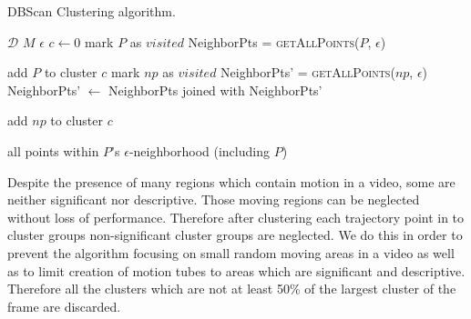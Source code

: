 \begin{algorithm}
 \caption{DBScan Clustering algorithm.}
   \label{alg:Clustering algorithm}
    \begin{algorithmic}[1]
    \Require  $\mathcal{D}$ 
    \Require $M$ 
    \Require $\epsilon$ 
        \State $c \leftarrow 0$ 
	  \EndIf
            \State mark $P$ as $visited$
            \State NeighborPts = \textsc{getAllPoints}($P$, $\epsilon$)
          \Else
          \EndIf
        \EndFor

	\State add $P$ to cluster $c$
	    \State mark $np$ as $visited$
	    \State NeighborPts' = \textsc{getAllPoints}($np$, $\epsilon$)
            \State NeighborPts' $\leftarrow$ NeighborPts joined with NeighborPts'
            \EndIf
	
	  \EndIf
         \State add $np$ to cluster $c$
         \EndIf
	\EndFor
       \EndFunction

       \Return all points within $P$'s $\epsilon$-neighborhood (including $P$)
       \EndFunction
\end{algorithmic}

\end{algorithm}


Despite the presence of many regions which contain motion in a video, some are neither significant nor descriptive.
Those moving regions can be neglected without loss of performance. Therefore after clustering each trajectory point in to cluster groups non-significant cluster groups are neglected.
We do this in order to prevent the algorithm focusing on small random moving areas in a video as well as to limit creation of motion tubes to areas which are significant and descriptive.
Therefore all the clusters which are not at least 50\% of the largest cluster of the frame are discarded.

